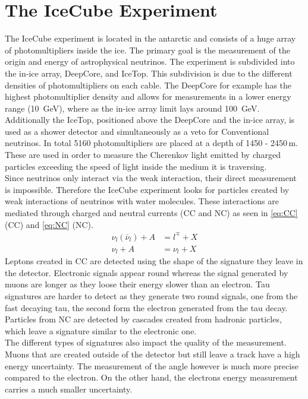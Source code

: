 \section{The IceCube Experiment}
\label{sec:The_IceCube_Experiment}
The IceCube experiment is located in the antarctic and consists of a huge array of photomultipliers inside the ice. 
The primary goal is the measurement of the origin and energy of astrophysical neutrinos.
The experiment is subdivided into the in-ice array, DeepCore, and IceTop. 
This subdivision is due to the different densities of photomultipliers on each cable. 
The DeepCore for example has the highest photomultiplier density and allows for measurements in a lower energy 
range (\qty{10}{\giga\eV}), where as the in-ice array limit lays around \qty{100}{\giga\eV}.
Additionally the IceTop, positioned above the DeepCore and the in-ice array, 
is used as a shower detector and simultaneously as a veto for Conventional neutrinos.
In total 5160 photomultipliers are placed at a depth of 1450 - 2450\,\unit{\meter}. 
These are used in order to measure the Cherenkov light emitted by charged particles exceeding the speed of light inside the medium it is traversing. \\

Since neutrinos only interact via the weak interaction, their direct measurement is impossible. 
Therefore the IceCube experiment looks for particles created by weak interactions of neutrinos with water molecules. 
These interactions are mediated through charged and neutral currents (CC and NC) as seen in \autoref{eq:CC} (CC) and \autoref{eq:NC} (NC).
\begin{align}
	\nu_l(\bar{\nu}_l) + A &= l^\mp + X \label{eq:CC}\\
	\nu_l + A &= \nu_l + X \label{eq:NC}	
\end{align}
Leptons created in CC are detected using the shape of the signature they leave in the detector. 
Electronic signals appear round whereas the signal generated by muons
are longer as they loose their energy slower than an electron. 
Tau signatures are harder to detect as they generate two round signals, 
one from the fast decaying tau, the second form the electron generated from the tau decay.
Particles from NC are detected by cascades created from hadronic particles, 
which leave a signature similar to the electronic one.\\

The different types of signatures also impact the quality of the measurement. Muons that are created outside of the detector but still leave a track have a high energy uncertainty. The measurement of the angle however is much more precise compared to the electron. On the other hand, the electrons energy measurement carries a much smaller uncertainty.\\

